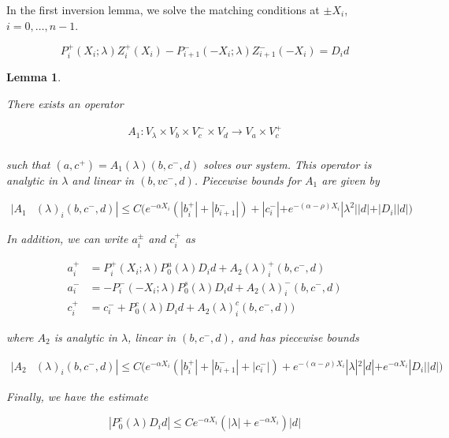 \documentclass[12pt]{article}
\newtheorem{lemma}{Lemma}
\begin{document}
In the first inversion lemma, we solve the matching conditions at $\pm X_i$, $i = 0, \dots, n-1$.

\[
P_i^+(X_i; \lambda) Z_i^+(X_i) - P_{i+1}^-(-X_i; \lambda) Z_{i+1}^-(-X_i) = D_i d
\]


\begin{lemma}\label{inv1}

There exists an operator

\begin{align*}
A_1: V_\lambda \times V_b \times V_c^- \times V_d \rightarrow V_a \times V_c^+\\
\end{align*}

such that $(a, c^+) = A_1(\lambda)(b, c^-,d)$ solves our system. This operator is analytic in $\lambda$ and linear in $(b,vc^-,d)$. Piecewise bounds for $A_1$ are given by

\begin{align}\label{A1bound}
|A_1&(\lambda)_i(b, c^-, d)|
\leq C \Big( e^{-\alpha X_i} (|b_i^+| + |b_{i+1}^-|) + |c_i^-| + e^{-(\alpha - \rho) X_i} |\lambda^2||d| + |D_i||d| \Big)
\end{align} 

In addition, we can write $a_i^\pm$ and $c_i^+$ as 

\begin{align*}
a_i^+ &= P_i^+(X_i; \lambda) P_0^u(\lambda) D_i d + A_2(\lambda)_i^+(b, c^-, d) \\
a_i^- &= -P_i^-(-X_i; \lambda) P_0^s(\lambda) D_i d + A_2(\lambda)_i^-(b, c^-, d) \\
c_i^+ &= c_i^- + P_0^c(\lambda) D_i d + A_2(\lambda)_i^c(b, c^-, d) )
\end{align*}

where $A_2$ is analytic in $\lambda$, linear in $(b, c^-, d)$, and has piecewise bounds

\begin{align*}
|A_2&(\lambda)_i(b, c^-, d)|
\leq C \Big( e^{-\alpha X_i} (|b_i^+| + |b_{i+1}^-| + |c_i^-|) + e^{-(\alpha - \rho) X_i} |\lambda|^2|d| + e^{-\alpha X_i} |D_i||d| \Big)
\end{align*}

Finally, we have the estimate

\begin{equation}\label{P0cDid}
|P_0^c(\lambda) D_i d| \leq C e^{-\alpha X_i}(|\lambda| + e^{-\alpha X_i})|d|
\end{equation}


\end{lemma}
\end{document}
